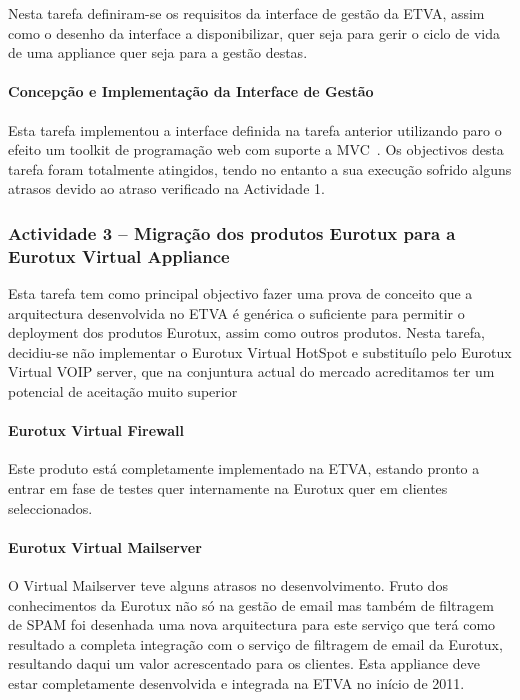 \documentclass[a4paper,12pt,portugues]{article}
\begin{document}
Nesta tarefa definiram-se os requisitos da interface de gestão da ETVA, assim
como o desenho da interface a disponibilizar, quer seja para gerir o ciclo de
vida de uma appliance quer seja para a gestão destas.

\paragraph{Concepção e Implementação da Interface de Gestão} %

Esta tarefa implementou a interface definida na tarefa anterior utilizando
paro o efeito um toolkit de programação web com suporte a MVC~\cite{mvc}.
Os objectivos desta tarefa foram totalmente atingidos, tendo no entanto a
sua execução sofrido alguns atrasos devido ao atraso verificado na Actividade 1.


\subsubsection{Actividade 3 – Migração dos produtos Eurotux para a Eurotux Virtual Appliance} %

Esta tarefa tem como principal objectivo fazer uma prova de conceito que a
arquitectura desenvolvida no ETVA é genérica o suficiente para permitir o
deployment dos produtos Eurotux, assim como outros produtos. Nesta tarefa,
decidiu-se não implementar o Eurotux Virtual HotSpot e substituílo pelo
Eurotux Virtual VOIP server, que na conjuntura actual do mercado acreditamos
ter um potencial de aceitação muito superior

\paragraph{Eurotux Virtual Firewall} 

Este produto está completamente implementado na ETVA, estando pronto a entrar
em fase de testes quer internamente na Eurotux quer em clientes seleccionados.

\paragraph{Eurotux Virtual Mailserver}

O Virtual Mailserver teve alguns atrasos no desenvolvimento. Fruto dos
conhecimentos da Eurotux não só na gestão de email mas também de filtragem de
SPAM foi desenhada uma nova arquitectura para este serviço que terá como
resultado a completa integração com o serviço de filtragem de email da
Eurotux, resultando daqui um valor acrescentado para os clientes. Esta
appliance deve estar completamente desenvolvida e integrada na ETVA no início
de 2011.
\end{document}
